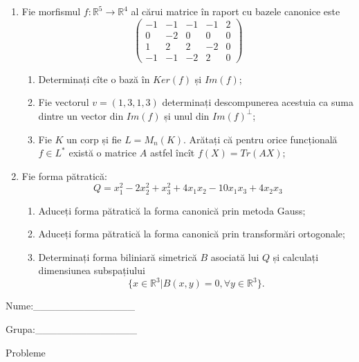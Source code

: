 \documentclass{article}
\begin{document}
\begin{enumerate}
 \item Fie morfismul $f:\mathbb{R}^5 \to \mathbb{R}^4$ al cărui matrice în raport cu bazele canonice este
$$\begin{pmatrix}
-1&-1&-1&-1&2\\
0&-2&0&0&0\\
1&2&2&-2&0\\
-1&-1&-2&2&0
\end{pmatrix}$$

\begin{enumerate}
\item Determinați cîte o bază în $Ker(f)$ și $Im(f)$;
\item Fie vectorul $v=(1,3,1,3)$ determinați descompunerea acestuia ca suma dintre un vector din $Im(f)$ și unul din $Im(f)^\perp$;
\item Fie $K$ un corp și fie $L=M_n(K)$. Arătați că pentru orice funcțională $f \in L^*$ există o matrice $A$ astfel încît $f(X)=Tr(AX)$;
\end{enumerate}
\item Fie forma pătratică:
$$Q= x_1^2-2x_2^2+x_3^2+4x_1x_2-10x_1x_3+4x_2x_3$$

\begin{enumerate}
\item Aduceți forma pătratică la forma canonică prin metoda Gauss;
\item Aduceți forma pătratică la forma canonică prin transformări ortogonale;
\item Determinați forma biliniară simetrică $B$ asociată lui $Q$ și calculați dimensiunea subspațiului
$$\{x \in \mathbb{R}^3 | B(x,y)=0,\forall y \in \mathbb{R}^3\}.$$

\end{enumerate}
\end{enumerate}
\newpage
\begin{flushright}
Nume:\_\_\_\_\_\_\_\_\_\_\_\_\_\_
 
 
Grupa:\_\_\_\_\_\_\_\_\_\_\_\_\_\_
\end{flushright}
\begin{center}
\vspace{2cm}
{\Large Probleme}
\vspace{2cm}
\end{center}
\end{document}
